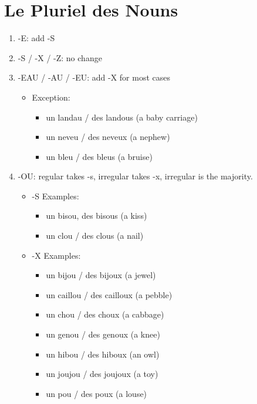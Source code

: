 \documentclass{book}
\begin{document}
    \section{Le Pluriel des Nouns}
        \begin{enumerate}
            \item -E: add -S
            \item -S / -X / -Z: no change
            \item -EAU / -AU / -EU: add -X for most cases
            \begin{itemize}
                \item Exception: 
                \begin{itemize}
                    \item un landau / des landous (a baby carriage)
                    \item un neveu / des neveux (a nephew)
                    \item un bleu / des bleus (a bruise)
                \end{itemize}
            \end{itemize}
            \item -OU: regular takes -s, irregular takes -x, irregular is the majority.
            \begin{itemize}
                \item -S Examples:
                \begin{itemize}
                    \item un bisou, des bisous (a kiss)
                    \item un clou / des clous (a nail)
                \end{itemize}
                \item -X Examples:
                \begin{itemize}
                    \item un bijou / des bijoux (a jewel)
                    \item un caillou / des cailloux (a pebble)
                    \item un chou / des choux (a cabbage)
                    \item un genou / des genoux (a knee)
                    \item un hibou / des hiboux (an owl)
                    \item un joujou / des joujoux (a toy)
                    \item un pou / des poux (a louse)

\end{itemize}
\end{itemize}
\end{enumerate}
\end{document}
